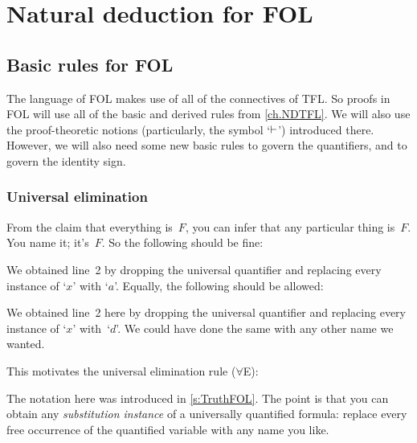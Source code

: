 \part{Natural deduction for FOL}
\label{ch.NDFOL}

\chapter{Basic rules for FOL}\label{s:BasicFOL}

The language of FOL makes use of all of the connectives of TFL. So proofs in FOL will use all of the basic and derived rules from \cref{ch.NDTFL}. We will also use the proof-theoretic notions (particularly, the symbol `$\vdash$') introduced there. However, we will also need some new basic rules to govern the quantifiers, and to govern the identity sign.


\section{Universal elimination}\label{s:forallElim}

From the claim that everything is~$F$, you can infer that any particular thing is~$F$. You name it; it's~$F$. So the following should be fine:
\begin{fitchproof}
	\PR
	 
\end{fitchproof}
We obtained line~2 by dropping the universal quantifier and replacing every instance of `$x$' with `$a$'. Equally, the following should be allowed:
\begin{fitchproof}
	\PR
	 
\end{fitchproof}
We obtained line~2 here by dropping the universal quantifier and replacing every instance of `$x$' with~`$d$'. We could have done the same with any other name we wanted.

This motivates the universal elimination rule ($\forall$E):


The notation here was introduced in \cref{s:TruthFOL}. The point is
that you can obtain any \emph{substitution instance} of a universally
quantified formula: replace every free occurrence of the quantified
variable with any name you like.

